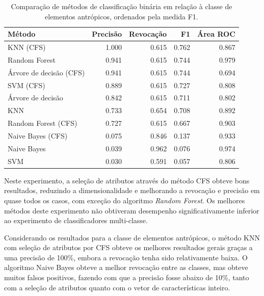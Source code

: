 \begin{table}[h]
\centering
\begin{tabulary}{\linewidth}{|L|R|R|R|R|}
\hline
\textbf{Método} & \textbf{Precisão} & \textbf{Revocação} & \textbf{F1} & \textbf{Área ROC} \\ \hline
KNN (CFS)               & 1.000 & 0.615 & 0.762 & 0.867 \\ \hline
Random Forest           & 0.941 & 0.615 & 0.744 & 0.979 \\ \hline
Árvore de decisão (CFS) & 0.941 & 0.615 & 0.744 & 0.694 \\ \hline
SVM (CFS)               & 0.889 & 0.615 & 0.727 & 0.808 \\ \hline
Árvore de decisão       & 0.842 & 0.615 & 0.711 & 0.802 \\ \hline
KNN                     & 0.733 & 0.654 & 0.708 & 0.892 \\ \hline
Random Forest (CFS)     & 0.727 & 0.615 & 0.667 & 0.903 \\ \hline
Naive Bayes (CFS)       & 0.075 & 0.846 & 0.137 & 0.933 \\ \hline
Naive Bayes             & 0.039 & 0.962 & 0.076 & 0.974 \\ \hline
SVM                     & 0.030 & 0.591 & 0.057 & 0.806 \\ \hline
\end{tabulary}
\caption{Comparação de métodos de classificação binária em relação à classe de elementos antrópicos, ordenados pela medida F1.}
\label{tab:experimentoBiclasseAntropico}
\end{table}

Neste experimento, a seleção de atributos através do método CFS obteve bons resultados, reduzindo a dimensionalidade e melhorando a revocação e precisão em quase todos os casos, com exceção do algoritmo \textit{Random Forest}. Os melhores métodos deste experimento não obtiveram desempenho significativamente inferior ao experimento de classificadores multi-classe.

Considerando os resultados para a classe de elementos antrópicos, o método KNN com seleção de atributos por CFS obteve os melhores resultados gerais graças a uma precisão de 100\%, embora a revocação tenha sido relativamente baixa. O algoritmo Naive Bayes obteve a melhor revocação entre as classes, mas obteve muitos falsos positivos, fazendo com que a precisão fosse abaixo de 10\%, tanto com a seleção de atributos quanto com o vetor de características inteiro.

